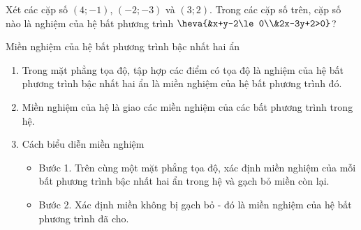 \begin{vd}%
	Xét các cặp số $(4;-1)$, $(-2;-3)$ và $(3;2)$. Trong các cặp số trên, cặp số nào là nghiệm của hệ bất phương trình
	$\heva{&x+y-2\le0\\&2x-3y+2>0}$?
\end{vd}
\begin{dang}{Miền nghiệm của hệ bất phương trình bậc nhất hai ẩn}
	\begin{enumerate}
		\item Trong mặt phẳng tọa độ, tập hợp các điểm có tọa độ là nghiệm của hệ bất phương trình bậc nhất hai ẩn là miền nghiệm của hệ bất phương trình đó.
		\item Miền nghiệm của hệ là giao các miền nghiệm của các bất phương trình trong hệ.
		\item Cách biểu diễn miền nghiệm
		\begin{itemize}
			\item Bước 1. Trên cùng một mặt phẳng tọa độ, xác định miền nghiệm của mỗi bất phương trình bậc nhất hai ẩn trong hệ và gạch bỏ miền còn lại.
			\item Bước 2. Xác định miền không bị gạch bỏ - đó là miền nghiệm của hệ bất phương trình đã cho.
		\end{itemize}
	\end{enumerate}
\end{dang}
